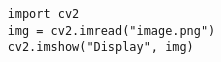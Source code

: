 \begin{verbatim}
    import cv2
    img = cv2.imread("image.png")
    cv2.imshow("Display", img)
\end{verbatim}

